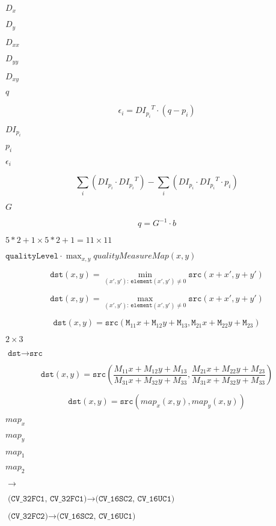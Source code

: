 \documentclass{article}
\begin{document}
$D_x$
\pagebreak

$D_y$
\pagebreak

$D_{xx}$
\pagebreak

$D_{yy}$
\pagebreak

$D_{xy}$
\pagebreak

$q$
\pagebreak

\[\epsilon _i = {DI_{p_i}}^T \cdot (q - p_i)\]
\pagebreak

${DI_{p_i}}$
\pagebreak

$p_i$
\pagebreak

$\epsilon_i$
\pagebreak

\[\sum _i(DI_{p_i} \cdot {DI_{p_i}}^T) - \sum _i(DI_{p_i} \cdot {DI_{p_i}}^T \cdot p_i)\]
\pagebreak

$G$
\pagebreak

\[q = G^{-1} \cdot b\]
\pagebreak

$5*2+1 \times 5*2+1 = 11 \times 11$
\pagebreak

$\texttt{qualityLevel} \cdot \max_{x,y} qualityMeasureMap(x,y)$
\pagebreak

\[\texttt{dst} (x,y) = \min _{(x',y'): \, \texttt{element} (x',y') \ne0 } \texttt{src} (x+x',y+y')\]
\pagebreak

\[\texttt{dst} (x,y) = \max _{(x',y'): \, \texttt{element} (x',y') \ne0 } \texttt{src} (x+x',y+y')\]
\pagebreak

\[\texttt{dst} (x,y) = \texttt{src} ( \texttt{M} _{11} x + \texttt{M} _{12} y + \texttt{M} _{13}, \texttt{M} _{21} x + \texttt{M} _{22} y + \texttt{M} _{23})\]
\pagebreak

$2\times 3$
\pagebreak

$\texttt{dst}\rightarrow\texttt{src}$
\pagebreak

\[\texttt{dst} (x,y) = \texttt{src} \left ( \frac{M_{11} x + M_{12} y + M_{13}}{M_{31} x + M_{32} y + M_{33}} , \frac{M_{21} x + M_{22} y + M_{23}}{M_{31} x + M_{32} y + M_{33}} \right )\]
\pagebreak

\[\texttt{dst} (x,y) = \texttt{src} (map_x(x,y),map_y(x,y))\]
\pagebreak

$map_x$
\pagebreak

$map_y$
\pagebreak

$map_1$
\pagebreak

$map_2$
\pagebreak

$\rightarrow$
\pagebreak

$\texttt{(CV_32FC1, CV_32FC1)} \rightarrow \texttt{(CV_16SC2, CV_16UC1)}$
\pagebreak

$\texttt{(CV_32FC2)} \rightarrow \texttt{(CV_16SC2, CV_16UC1)}$
\pagebreak
\end{document}
